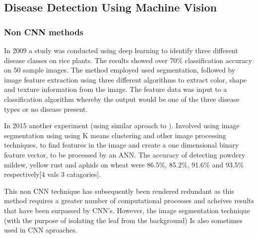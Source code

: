   \subsection{Disease Detection Using Machine Vision}
  \subsubsection{Non CNN methods}
    In 2009 a study \citep{Anthonys2009} was conducted using deep learning to identify three different disease classes on rice plants. The results showed over 70\% classification accuracy on 50 sample images. The method employed used segmentation, followed by image feature extraction using three different algorithms to extract color, shape and texture information from the image. The feature data was input to a classification algorithm whereby the output would be one of the three disease types or no disease present.
    \par
    In 2015 another experiment (using similar aproach to \citep{Anthonys2009}). Involved using image segmentation
    using using K means clustering and other image processing techniques, to find features in the image and create a one dimensional binary feature vector, to be processed by an ANN. \citep{Khirade2015} The accuracy of detecting powdery mildew, yellow rust and aphids on wheat were 86.5\%, 85.2\%, 91.6\% and 93.5\% respectively[4 vals 3 catagories].
    \par
    This non CNN technique has subsequently been rendered redundant as this method requires a greater number of
    computational processes and acheives results that have been surpassed by CNN's. However, the image segmentation technique (with the purpose of isolating the leaf from the background) Is also sometimes used in CNN aproaches.
